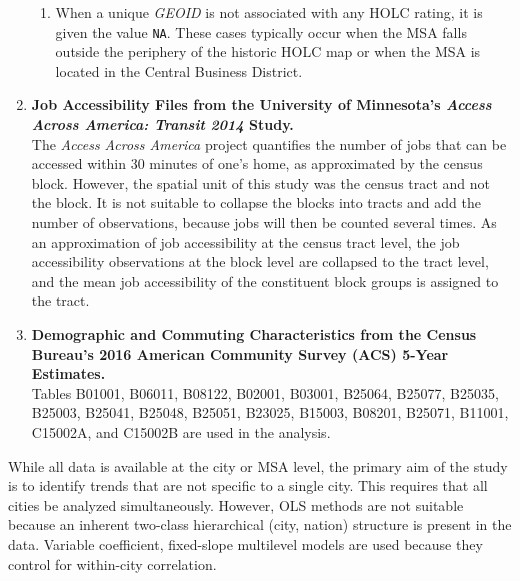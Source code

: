 \documentclass[paper=letter, fontsize=12pt]{scrartcl} %
\begin{document}
\begin{enumerate}
\begin{enumerate}
			\item When a unique \textit{GEOID} is not associated with any HOLC rating, it is given the value \texttt{NA}. These cases typically occur when the MSA falls outside the periphery of the historic HOLC map or when the MSA is located in the Central Business District.
		\end{enumerate}
		\item \textbf{Job Accessibility Files from the University of Minnesota's \textit{Access Across America: Transit 2014} Study.} \cite{owen} \\
		The \textit{Access Across America} project quantifies the number of jobs that can be accessed within 30 minutes of one's home, as approximated by the census block. However, the spatial unit of this study was the census tract and not the block. It is not suitable to collapse the blocks into tracts and add the number of observations, because jobs will then be counted several times. As an approximation of job accessibility at the census tract level, the job accessibility observations at the block level are collapsed to the tract level, and the mean job accessibility of the constituent block groups is assigned to the tract.
		\item \textbf{Demographic and Commuting Characteristics from the Census Bureau's 2016 American Community Survey (ACS) 5-Year Estimates.} \cite{acs16}\\
		Tables B01001, B06011, B08122, B02001, B03001, B25064, B25077, B25035, B25003, B25041, B25048, B25051, B23025, B15003, B08201, B25071, B11001, C15002A, and C15002B are used in the analysis.
	\end{enumerate}
	While all data is available at the city or MSA level, the primary aim of the study is to identify trends that are not specific to a single city. This requires that all cities be analyzed simultaneously. However, OLS methods are not suitable because an inherent two-class hierarchical (city, nation) structure is present in the data. Variable coefficient, fixed-slope multilevel models are used because they control for within-city correlation.
	
	\clearpage
	
\end{document}
